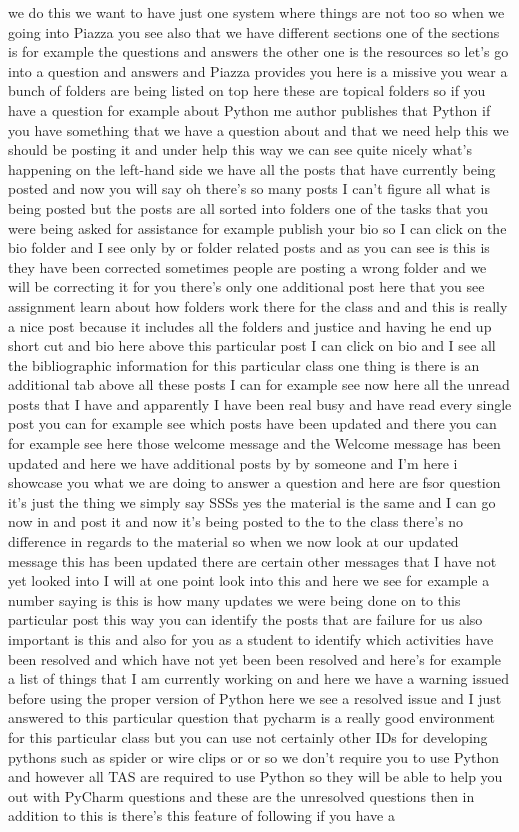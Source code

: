 we do this we want to have just one system where things are not too so when we going into Piazza you see also that we have different sections one of the sections is for example the questions and answers the other one is the resources so let's go into a question and answers and Piazza provides you here is a missive you wear a bunch of folders are being listed on top here these are topical folders so if you have a question for example about Python me author publishes that Python if you have something that we have a question about and that we need help this we should be posting it and under help this way we can see quite nicely what's happening on the left-hand side we have all the posts that have currently being posted and now you will say oh there's so many posts I can't figure all what is being posted but the posts are all sorted into folders one of the tasks that you were being asked for assistance for example publish your bio so I can click on the bio folder and I see only by or folder related posts and as you can see is this is they have been corrected sometimes people are posting a wrong folder and we will be correcting it for you there's only one additional post here that you see assignment learn about how folders work there for the class and and this is really a nice post because it includes all the folders and justice and having he end up short cut and bio here above this particular post I can click on bio and I see all the bibliographic information for this particular class one thing is there is an additional tab above all these posts I can for example see now here all the unread posts that I have and apparently I have been real busy and have read every single post you can for example see which posts have been updated and there you can for example see here those welcome message and the Welcome message has been updated and here we have additional posts by by someone and I'm here i showcase you what we are doing to answer a question and here are fsor question it's just the thing we simply say SSSs yes the material is the same and I can go now in and post it and now it's being posted to the to the class there's no difference in regards to the material so when we now look at our updated message this has been updated there are certain other messages that I have not yet looked into I will at one point look into this and here we see for example a number saying is this is how many updates we were being done on to this particular post this way you can identify the posts that are failure for us also important is this and also for you as a student to identify which activities have been resolved and which have not yet been been resolved and here's for example a list of things that I am currently working on and here we have a warning issued before using the proper version of Python here we see a resolved issue and I just answered to this particular question that pycharm is a really good environment for this particular class but you can use not certainly other IDs for developing pythons such as spider or wire clips or or so we don't require you to use Python and however all TAS are required to use Python so they will be able to help you out with PyCharm questions and these are the unresolved questions then in addition to this is there's this feature of following if you have a 
